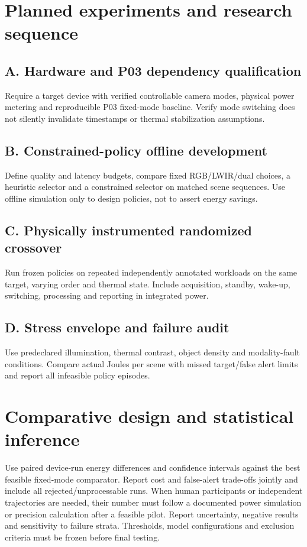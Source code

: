 \documentclass[11pt,a4paper]{article}
\begin{document}
\section{Planned experiments and research sequence}
\subsection{A. Hardware and P03 dependency qualification}
Require a target device with verified controllable camera modes, physical power metering and reproducible P03 fixed-mode baseline. Verify mode switching does not silently invalidate timestamps or thermal stabilization assumptions.

\subsection{B. Constrained-policy offline development}
Define quality and latency budgets, compare fixed RGB/LWIR/dual choices, a heuristic selector and a constrained selector on matched scene sequences. Use offline simulation only to design policies, not to assert energy savings.

\subsection{C. Physically instrumented randomized crossover}
Run frozen policies on repeated independently annotated workloads on the same target, varying order and thermal state. Include acquisition, standby, wake-up, switching, processing and reporting in integrated power.

\subsection{D. Stress envelope and failure audit}
Use predeclared illumination, thermal contrast, object density and modality-fault conditions. Compare actual Joules per scene with missed target/false alert limits and report all infeasible policy episodes.

\section{Comparative design and statistical inference}
Use paired device-run energy differences and confidence intervals against the best feasible fixed-mode comparator. Report cost and false-alert trade-offs jointly and include all rejected/unprocessable runs. When human participants or independent trajectories are needed, their number must follow a documented power simulation or precision calculation after a feasible pilot. Report uncertainty, negative results and sensitivity to failure strata. Thresholds, model configurations and exclusion criteria must be frozen before final testing.
\end{document}
